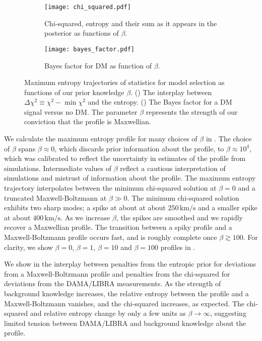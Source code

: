 \documentclass{article}
\begin{document}
\begin{figure}
    \centering
    \begin{subfigure}[t]{0.49\textwidth}
        \centering
        \texttt{[image: chi\_squared.pdf]}
        \caption{Chi-squared, entropy and their sum as it appears in the posterior as functions of $\beta$.}
        \label{fig:chi_squared}
    \end{subfigure}
    \begin{subfigure}[t]{0.49\textwidth}
        \centering
        \texttt{[image: bayes\_factor.pdf]}
        \caption{Bayes factor for DM as function of $\beta$.}
        \label{fig:bf}
    \end{subfigure}
    \caption{Maximum entropy trajectories of statistics for model selection as functions of our prior knowledge $\beta$. () The interplay between $\Delta \chi^2 \equiv \chi^2 - \min \chi^2$ and the entropy. () The Bayes factor for a DM signal versus no DM. The parameter $\beta$ represents the strength of our conviction that the profile is Maxwellian.}
    \label{fig:stat}
\end{figure}

We calculate the maximum entropy profile for many choices of $\beta$ in . The choice of $\beta$ spans $\beta\approx0$, which discards prior information about the profile, to $\beta \approx 10^4$, which was calibrated to reflect the uncertainty in estimates of the profile from simulations. Intermediate values of $\beta$ reflect a cautious interpretation of simulations and mistrust of information about the profile. The maximum entropy trajectory interpolates between the minimum chi-squared solution at $\beta=0$ and a truncated Maxwell-Boltzmann at $\beta \gg 0$. The minimum chi-squared solution exhibits two sharp modes; a spike at about at about $250\,\text{km/s}$ and a smaller spike at about $400\,\text{km/s}$. 
As we increase $\beta$, the spikes are smoothed and we rapidly recover a Maxwellian profile. The transition between a spiky profile and a Maxwell-Boltzmann profile occurs fast, and is roughly complete once $\beta \gtrsim 100$. For clarity, we show $\beta=0$, $\beta=1$, $\beta=10$ and $\beta=100$ profiles in . 

We show in  the interplay between penalties from the entropic prior for deviations from a Maxwell-Boltzmann profile and penalties from the chi-squared for deviations from the DAMA/LIBRA measurements. As the strength of background knowledge increases, the relative entropy between the profile and a Maxwell-Boltzmann vanishes, and the chi-squared increases, as expected. The chi-squared and relative entropy change by only a few units as $\beta \to \infty$, suggesting limited tension between DAMA/LIBRA and background knowledge about the profile. 
\end{document}
